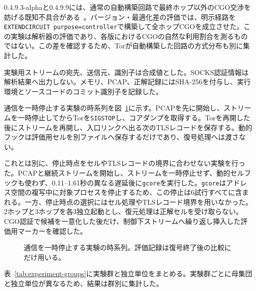 \documentclass[10pt,a4paper]{ltjsarticle}
\newcommand{\code}[1]{\nolinkurl{#1}}
\begin{document}
0.4.9.3-alphaと0.4.9.9には、通常の自動構築回路で最終ホップ以外のCGO交渉を妨げる既知不具合がある~\cite{torrelease04912}。バージョン・最適化差の評価では、明示経路を\code{EXTENDCIRCUIT purpose=controller}で構築して全ホップCGOを成立させた。この実験は解析器の評価であり、各版におけるCGOの自然な利用割合を測るものではない。この差を確認するため、Torが自動構築した回路の方式分布も別に集計した。

実験用ストリームの宛先、送信元、識別子は合成値とした。SOCKS認証情報は解析結果へ出力しない。メモリ、PCAP、正解記録にはSHA-256を付与し、実行環境とソースコードのコミット識別子を記録した。

通信を一時停止する実験の時系列を図~\ref{fig:acquisition-timeline}に示す。PCAPを先に開始し、ストリームを一時停止してからTorを\code{SIGSTOP}し、コアダンプを取得する。Torを再開した後にストリームを再開し、入口リンクへ出る次のTLSレコードを保存する。動的フックは評価用セルを別ファイルへ保存するだけであり、復号処理へは渡さない。

これとは別に、停止時点をセルやTLSレコードの境界に合わせない実験を行った。PCAPと継続ストリームを開始し、ストリームを一時停止せず、動的セルフックも使わず、0.11--1.61秒の異なる遅延後に\code{gcore}を実行した。\code{gcore}はアドレス空間の複写中に対象プロセスを停止するため、この停止は6試行すべてに含まれる。一方、停止時点の選択にはセル処理やTLSレコード境界を用いなかった。2ホップと3ホップを各3独立起動とし、復元処理は正解セルを受け取らない。CGO認証で候補を一意化した後だけ、制御下ストリームへ繰り返し挿入した評価用マーカーを確認した。

\begin{figure}[!tbp]
\centering
{}
\caption{通信を一時停止する実験の時系列。評価記録は復号終了後の比較にだけ用いる。}
\label{fig:acquisition-timeline}
\end{figure}

表~\ref{tab:experiment-groups}に実験群と独立単位をまとめる。実験群ごとに母集団と独立単位が異なるため、結果は群別に集計した。
\end{document}
